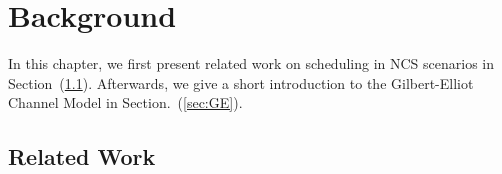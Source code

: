 \chapter{Background}


In this chapter, we first present related work on scheduling in NCS scenarios in
Section~(\ref{sec:survey}). Afterwards, we give a short introduction to the
Gilbert-Elliot Channel Model in Section.~(\ref{sec:GE}). 

\section{Related Work} \label{sec:survey}

